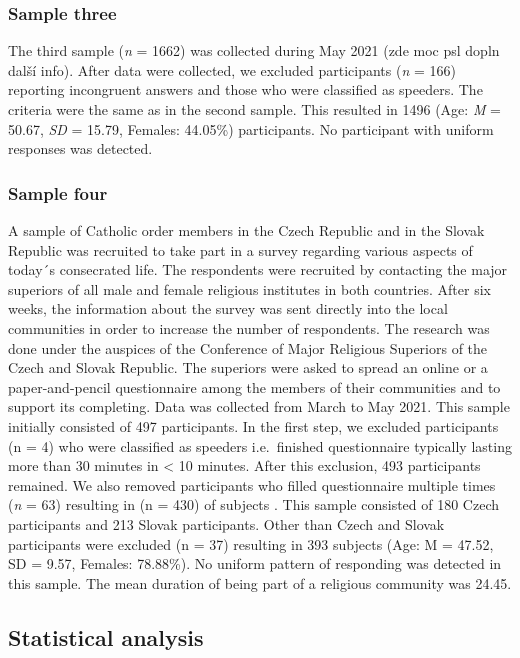 \documentclass[ijerph,article,accept,moreauthors,pdftex]{mdpi}
\begin{document}
\hypertarget{sample-three}{%
\subsubsection{Sample three}\label{sample-three}}

The third sample (\emph{n} = 1662) was collected during May 2021 (zde
moc psl dopln další info). After data were collected, we excluded
participants (\emph{n} = 166) reporting incongruent answers and those
who were classified as speeders. The criteria were the same as in the
second sample. This resulted in 1496 (Age: \emph{M} = 50.67, \emph{SD} =
15.79, Females: 44.05\%) participants. No participant with uniform
responses was detected.

\hypertarget{sample-four}{%
\subsubsection{Sample four}\label{sample-four}}

A sample of Catholic order members in the Czech Republic and in the
Slovak Republic was recruited to take part in a survey regarding various
aspects of today´s consecrated life. The respondents were recruited by
contacting the major superiors of all male and female religious
institutes in both countries. After six weeks, the information about the
survey was sent directly into the local communities in order to increase
the number of respondents. The research was done under the auspices of
the Conference of Major Religious Superiors of the Czech and Slovak
Republic. The superiors were asked to spread an online or a
paper-and-pencil questionnaire among the members of their communities
and to support its completing. Data was collected from March to May
2021. This sample initially consisted of 497 participants. In the first
step, we excluded participants (n = 4) who were classified as speeders
i.e.~finished questionnaire typically lasting more than 30 minutes in
\textless{} 10 minutes. After this exclusion, 493 participants remained.
We also removed participants who filled questionnaire multiple times
(\emph{n} = 63) resulting in (n = 430) of subjects . This sample
consisted of 180 Czech participants and 213 Slovak participants. Other
than Czech and Slovak participants were excluded (n = 37) resulting in
393 subjects (Age: M = 47.52, SD = 9.57, Females: 78.88\%). No uniform
pattern of responding was detected in this sample. The mean duration of
being part of a religious community was 24.45.

\hypertarget{statistical-analysis}{%
\subsection{Statistical analysis}\label{statistical-analysis}}
\end{document}
